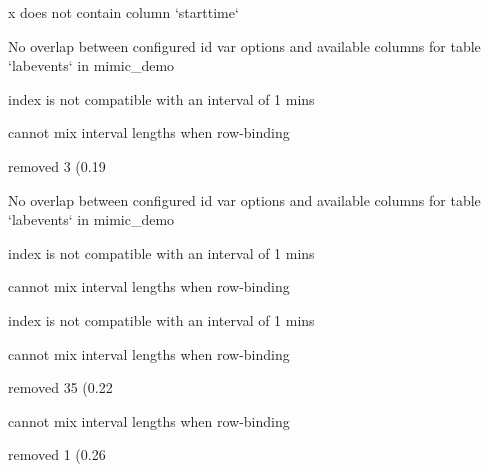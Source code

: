 \documentclass[
]{jss}
\begin{document}
\begin{CodeChunk}
\begin{CodeOutput}
x does not contain column `starttime`
\end{CodeOutput}

\begin{CodeOutput}
No overlap between configured id var options and available columns for table
`labevents` in mimic_demo
\end{CodeOutput}

\begin{CodeOutput}
index is not compatible with an interval of 1 mins
\end{CodeOutput}

\begin{CodeOutput}
cannot mix interval lengths when row-binding
\end{CodeOutput}

\begin{CodeOutput}
removed 3 (0.19%
\end{CodeOutput}

\begin{CodeOutput}
No overlap between configured id var options and available columns for table
`labevents` in mimic_demo
\end{CodeOutput}

\begin{CodeOutput}
index is not compatible with an interval of 1 mins
\end{CodeOutput}

\begin{CodeOutput}
cannot mix interval lengths when row-binding
\end{CodeOutput}

\begin{CodeOutput}
index is not compatible with an interval of 1 mins
\end{CodeOutput}

\begin{CodeOutput}
cannot mix interval lengths when row-binding
\end{CodeOutput}

\begin{CodeOutput}
removed 35 (0.22%
\end{CodeOutput}

\begin{CodeOutput}
cannot mix interval lengths when row-binding
\end{CodeOutput}

\begin{CodeOutput}
removed 1 (0.26%
\end{CodeOutput}


\end{CodeChunk}
\end{document}
